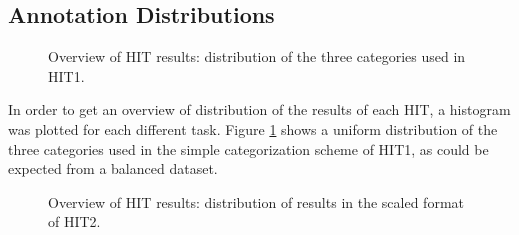 \documentclass[11pt, a4paper,onecolumn]{article}
\begin{document}
\subsection{Annotation Distributions}
\label{sect:distr}

\begin{figure}[h]
  \begin{center}
	\caption{Overview of HIT results: distribution of the three categories used in HIT1.}
	\label{distr1}
  \end{center}
\end{figure}

In order to get an overview of distribution of the results of each HIT, a histogram was plotted for each different task. Figure \ref{distr1} shows a uniform distribution of the three categories used in the simple categorization scheme of HIT1, as could be expected from a balanced dataset.

\begin{figure}[h]
  \begin{center}
	\caption{Overview of HIT results:  distribution of results in the scaled format of HIT2.}
	\label{distr2}
  \end{center}
\end{figure}
\end{document}
